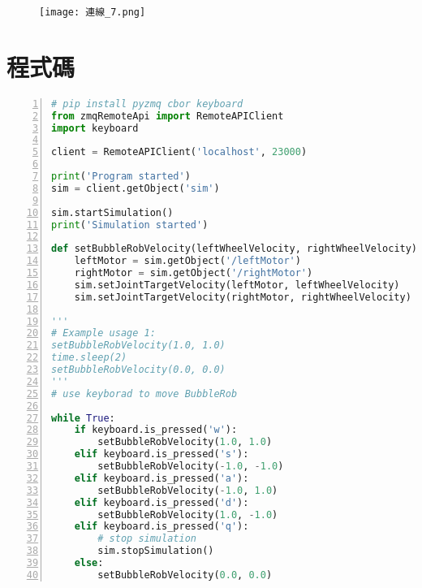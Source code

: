 \begin{figure}[hbt!]
  \begin{center}
    \texttt{[image: 連線\_7.png]}
  \end{center}
  \caption[設定規定的ipv6]{}
  \label{fig:photo}
\end{figure}

\newpage

\section{程式碼}
\begin{lstlisting}[language=Python, frame=single, numbers=left, captionpos=b, basicstyle=\ttfamily\small,showstringspaces=false, breaklines=true, tabsize=4, xleftmargin=15pt]
# pip install pyzmq cbor keyboard
from zmqRemoteApi import RemoteAPIClient
import keyboard

client = RemoteAPIClient('localhost', 23000)

print('Program started')
sim = client.getObject('sim')

sim.startSimulation()
print('Simulation started')

def setBubbleRobVelocity(leftWheelVelocity, rightWheelVelocity):
    leftMotor = sim.getObject('/leftMotor')
    rightMotor = sim.getObject('/rightMotor')
    sim.setJointTargetVelocity(leftMotor, leftWheelVelocity)
    sim.setJointTargetVelocity(rightMotor, rightWheelVelocity)

'''
# Example usage 1:
setBubbleRobVelocity(1.0, 1.0)
time.sleep(2)
setBubbleRobVelocity(0.0, 0.0)
'''
# use keyborad to move BubbleRob

while True:
    if keyboard.is_pressed('w'):
        setBubbleRobVelocity(1.0, 1.0)
    elif keyboard.is_pressed('s'):
        setBubbleRobVelocity(-1.0, -1.0)
    elif keyboard.is_pressed('a'):
        setBubbleRobVelocity(-1.0, 1.0)
    elif keyboard.is_pressed('d'):
        setBubbleRobVelocity(1.0, -1.0)
    elif keyboard.is_pressed('q'):
        # stop simulation
        sim.stopSimulation()
    else:
        setBubbleRobVelocity(0.0, 0.0)
\end{lstlisting}

